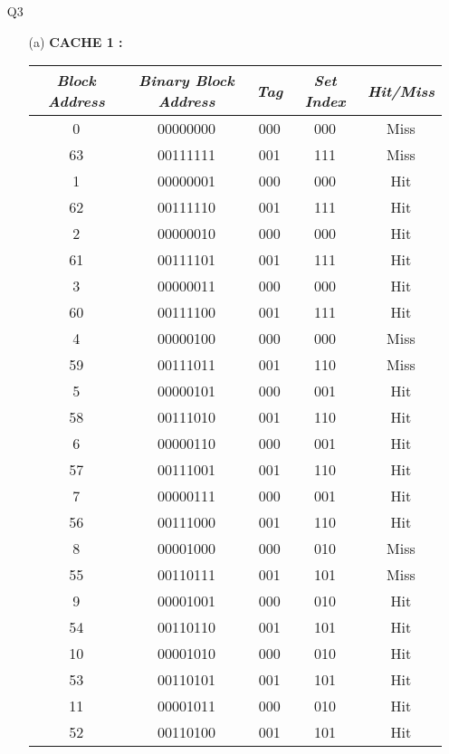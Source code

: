 \documentclass[letterpaper]{article}
\begin{document}
\begin{large}
\begin{flushleft}
\begin{enumerate}
\item[Q3]
\begin{enumerate}
\item[(a)]
\textbf{CACHE 1 :}\\
\begin{table}[h]
\centering
\begin{tabular}{|c|c|c|c|c|}
\hline
\textit{\textbf{Block Address}} & \textit{\textbf{Binary Block Address }}&\textit{\textbf{ Tag }}& \textit{\textbf{Set Index }}& \textit{\textbf{Hit/Miss}}\\
\hline
0 & 00000000 & 000 & 000 & Miss\\
\hline
63 & 00111111 & 001 & 111 & Miss\\
\hline
1 & 00000001 & 000 & 000 & Hit\\
\hline
62 & 00111110 & 001 & 111 & Hit\\
\hline
2 & 00000010 & 000 & 000 & Hit\\
\hline
61 & 00111101 & 001 & 111 & Hit\\
\hline
3 & 00000011 & 000 & 000 & Hit\\
\hline
60 & 00111100 & 001 & 111 & Hit\\
\hline
4 & 00000100 & 000 & 000 & Miss\\
\hline
59 & 00111011 & 001 & 110 & Miss\\
\hline 
5 & 00000101 & 000 & 001 & Hit\\
\hline
58 & 00111010 & 001 & 110 & Hit\\
\hline
6 & 00000110 & 000 & 001 & Hit\\
\hline
57 & 00111001 & 001 & 110 & Hit\\
\hline
7 & 00000111 & 000 & 001 & Hit\\
\hline
56 & 00111000 & 001 & 110 & Hit\\
\hline
8 & 00001000 & 000 & 010 & Miss\\
\hline
55 & 00110111 & 001 & 101 & Miss\\
\hline
9 & 00001001 & 000 & 010 & Hit\\
\hline
54 & 00110110 & 001 & 101 & Hit\\
\hline
10 & 00001010 & 000 & 010 & Hit\\
\hline
53 & 00110101 & 001 & 101 & Hit\\
\hline
11 & 00001011 & 000 & 010 & Hit\\
\hline
52 & 00110100 & 001 & 101 & Hit\\
\hline
\end{tabular}
\end{table}

\end{enumerate}
\end{enumerate}
\end{flushleft}
\end{large}
\end{document}
